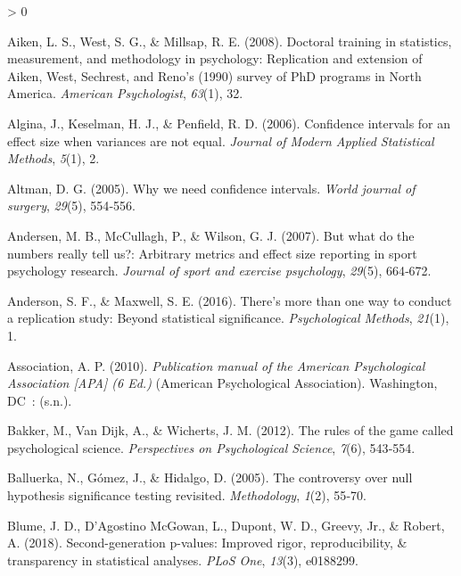 \documentclass[
  12pt,
  french,
]{article}
\newlength{\cslhangindent}
\newenvironment{CSLReferences}[2] %
 {%
  \setlength{\parindent}{0pt}
  \ifodd #1 \everypar{\setlength{\hangindent}{\cslhangindent}}\ignorespaces\fi
  \ifnum #2 > 0
  \setlength{\parskip}{#2\baselineskip}
  \fi
 }%
 {}
\begin{document}
\hypertarget{refs}{}
\begin{CSLReferences}{1}{0}
\leavevmode\hypertarget{ref-aiken_doctoral_2008}{}%
Aiken, L. S., West, S. G., \& Millsap, R. E. (2008). Doctoral training
in statistics, measurement, and methodology in psychology: Replication
and extension of Aiken, West, Sechrest, and Reno's (1990) survey of
{PhD} programs in North America. \emph{American Psychologist},
\emph{63}(1), 32.

\leavevmode\hypertarget{ref-algina_confidence_2006}{}%
Algina, J., Keselman, H. J., \& Penfield, R. D. (2006). Confidence
intervals for an effect size when variances are not equal. \emph{Journal
of Modern Applied Statistical Methods}, \emph{5}(1), 2.

\leavevmode\hypertarget{ref-altman_why_2005}{}%
Altman, D. G. (2005). Why we need confidence intervals. \emph{World
journal of surgery}, \emph{29}(5), 554‑556.

\leavevmode\hypertarget{ref-andersen_but_2007}{}%
Andersen, M. B., McCullagh, P., \& Wilson, G. J. (2007). But what do the
numbers really tell us?: Arbitrary metrics and effect size reporting in
sport psychology research. \emph{Journal of sport and exercise
psychology}, \emph{29}(5), 664‑672.

\leavevmode\hypertarget{ref-anderson_theres_2016}{}%
Anderson, S. F., \& Maxwell, S. E. (2016). There's more than one way to
conduct a replication study: Beyond statistical significance.
\emph{Psychological Methods}, \emph{21}(1), 1.

\leavevmode\hypertarget{ref-association_publication_2010}{}%
Association, A. P. (2010). \emph{Publication manual of the American
Psychological Association {[}{APA}{]} (6 Ed.)} (American Psychological
Association). Washington, {DC}~: (s.n.).

\leavevmode\hypertarget{ref-bakker_rules_2012}{}%
Bakker, M., Van Dijk, A., \& Wicherts, J. M. (2012). The rules of the
game called psychological science. \emph{Perspectives on Psychological
Science}, \emph{7}(6), 543‑554.

\leavevmode\hypertarget{ref-balluerka_controversy_2005}{}%
Balluerka, N., Gómez, J., \& Hidalgo, D. (2005). The controversy over
null hypothesis significance testing revisited. \emph{Methodology},
\emph{1}(2), 55‑70.

\leavevmode\hypertarget{ref-blume_second-generation_2018}{}%
Blume, J. D., D'Agostino McGowan, L., Dupont, W. D., Greevy, Jr., \&
Robert, A. (2018). Second-generation p-values: Improved rigor,
reproducibility, \& transparency in statistical analyses. \emph{{PLoS}
One}, \emph{13}(3), e0188299.


\end{CSLReferences}
\end{document}
